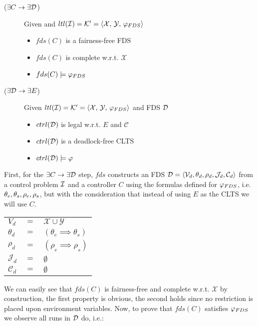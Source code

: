 \begin{description}
	\item[($\exists C \rightarrow \exists \mathcal{D}$)] Given \controlProblemDef and $\fdsEmbedding$
		\begin{itemize}
			\item $fds(C)$ is a fairness-free FDS			
			\item $fds(C)$ is complete w.r.t. $\mathcal{X}$
			\item $fds(C) \models \varphi_{FDS}$
		\end{itemize}
	\item[($\exists \mathcal{D} \rightarrow \exists E$)] Given $\fdsEmbedding$ and FDS $\mathcal{D}$
		\begin{itemize}
			\item $ctrl(\mathcal{D})$ is legal w.r.t. $E$ and $\mathcal{C}$
			\item $ctrl(\mathcal{D})$ is a deadlock-free CLTS			
			\item $ctrl(\mathcal{D}) \models \varphi$
		\end{itemize}	
\end{description}

First,  for the $\exists C \rightarrow \exists \mathcal{D}$ step, $fds$ constructs an FDS $\mathcal{D}=\langle \mathcal V_d, \theta_d, \rho_d, \mathcal{J}_d, \mathcal{C}_d \rangle$ from a control problem $\mathcal{I}$ and a controller $C$ using the formulas defined for $\varphi_{FDS}$, i.e. ${\theta_e}, {\theta_s}, {\rho_e}, {\rho_s}$, but with the consideration that instead of using $E$ as the CLTS we will use $C$.

\begin{tabular}{ l c l }
	$V_d$ & $=$ & $\mathcal{X} \cup \mathcal{Y}$\\	
	$\theta_d$ & $=$ & $(\theta_e \implies \theta_s)$\\
	$\rho_d$ & $=$ & $(\rho_e \implies \rho_s)$\\	
	$\mathcal{J}_d$ & $=$ & $\emptyset$\\
	$\mathcal{C}_d$ & $=$ & $\emptyset$\\
\end{tabular}

We can easily see that $fds(C)$ is fairness-free and complete w.r.t. $\mathcal{X}$ by construction, the first property is obvious, the second holds since no restriction is placed upon environment variables. Now, to prove that $fds(C)$ satisfies $\varphi_{FDS}$ we observe all runs in $\mathcal{D}$ do, i.e.:

